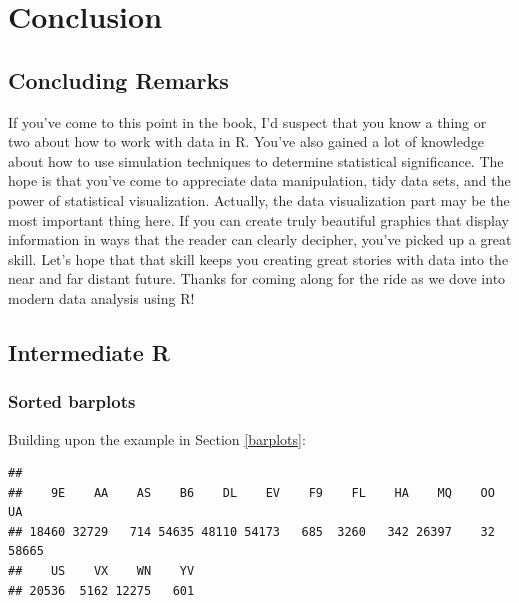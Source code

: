 \documentclass[]{tufte-book}
\newenvironment{Shaded}{\begin{snugshade}}{\end{snugshade}}
\newcommand{\KeywordTok}[1]{\textcolor[rgb]{0.13,0.29,0.53}{\textbf{{#1}}}}
\newcommand{\StringTok}[1]{\textcolor[rgb]{0.31,0.60,0.02}{{#1}}}
\newcommand{\NormalTok}[1]{{#1}}
\begin{document}
\part{Conclusion}\label{part-conclusion}

\chapter{Concluding Remarks}\label{conclusion}

If you've come to this point in the book, I'd suspect that you know a
thing or two about how to work with data in R. You've also gained a lot
of knowledge about how to use simulation techniques to determine
statistical significance. The hope is that you've come to appreciate
data manipulation, tidy data sets, and the power of statistical
visualization. Actually, the data visualization part may be the most
important thing here. If you can create truly beautiful graphics that
display information in ways that the reader can clearly decipher, you've
picked up a great skill. Let's hope that that skill keeps you creating
great stories with data into the near and far distant future. Thanks for
coming along for the ride as we dove into modern data analysis using R!

\appendix


\chapter{Intermediate R}\label{appendix1}

\section{Sorted barplots}\label{sorted-barplots}

Building upon the example in Section \ref{barplots}:

\begin{Shaded}
\end{Shaded}

\begin{verbatim}
## 
##    9E    AA    AS    B6    DL    EV    F9    FL    HA    MQ    OO    UA 
## 18460 32729   714 54635 48110 54173   685  3260   342 26397    32 58665 
##    US    VX    WN    YV 
## 20536  5162 12275   601
\end{verbatim}
\end{document}
